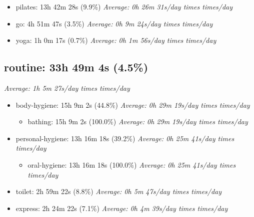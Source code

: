 \documentclass[12pt]{extarticle}
\begin{document}
\begin{itemize}[topsep=0pt, itemsep=-0.5ex]
    \item pilates: 13h 42m 28s (9.9\%)
        \textit{Average: 0h 26m 31s/day  times  times/day}\par
    \item go: 4h 51m 47s (3.5\%)
        \textit{Average: 0h 9m 24s/day  times  times/day}\par
    \item yoga: 1h 0m 17s (0.7\%)
        \textit{Average: 0h 1m 56s/day  times  times/day}\par
\end{itemize}
{\fontsize{16}{19.2}\selectfont\subsection*{routine: 33h 49m 4s (4.5\%)}}
\textit{Average: 1h 5m 27s/day  times  times/day}\par
\begin{itemize}[topsep=0pt, itemsep=-0.5ex]
    \item body-hygiene: 15h 9m 2s (44.8\%)
        \textit{Average: 0h 29m 19s/day  times  times/day}\par
\begin{itemize}[topsep=0pt, itemsep=-0.5ex]
    \item bathing: 15h 9m 2s (100.0\%)
        \textit{Average: 0h 29m 19s/day  times  times/day}\par
\end{itemize}
    \item personal-hygiene: 13h 16m 18s (39.2\%)
        \textit{Average: 0h 25m 41s/day  times  times/day}\par
\begin{itemize}[topsep=0pt, itemsep=-0.5ex]
    \item oral-hygiene: 13h 16m 18s (100.0\%)
        \textit{Average: 0h 25m 41s/day  times  times/day}\par
\end{itemize}
    \item toilet: 2h 59m 22s (8.8\%)
        \textit{Average: 0h 5m 47s/day  times  times/day}\par
    \item express: 2h 24m 22s (7.1\%)
        \textit{Average: 0h 4m 39s/day  times  times/day}\par
\end{itemize}
\end{document}
